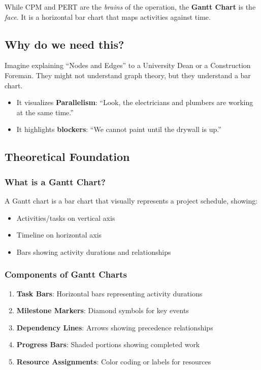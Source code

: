 \documentclass[
  letterpaper,
  DIV=11,
  numbers=noendperiod]{scrreprt}
\providecommand{\tightlist}{%
  \setlength{\itemsep}{0pt}\setlength{\parskip}{0pt}}
\begin{document}
While CPM and PERT are the \emph{brains} of the operation, the
\textbf{Gantt Chart} is the \emph{face}. It is a horizontal bar chart
that maps activities against time.

\subsection{Why do we need this?}\label{why-do-we-need-this}

Imagine explaining ``Nodes and Edges'' to a University Dean or a
Construction Foreman. They might not understand graph theory, but they
understand a bar chart.

\begin{itemize}
\tightlist
\item
  It visualizes \textbf{Parallelism}: ``Look, the electricians and
  plumbers are working at the same time.''
\item
  It highlights \textbf{blockers}: ``We cannot paint until the drywall
  is up.''
\end{itemize}

\subsection{Theoretical Foundation}\label{theoretical-foundation-6}

\subsubsection{What is a Gantt Chart?}\label{what-is-a-gantt-chart}

A Gantt chart is a bar chart that visually represents a project
schedule, showing:

\begin{itemize}
\tightlist
\item
  Activities/tasks on vertical axis
\item
  Timeline on horizontal axis
\item
  Bars showing activity durations and relationships
\end{itemize}

\subsubsection{Components of Gantt
Charts}\label{components-of-gantt-charts}

\begin{enumerate}
\def\labelenumi{\arabic{enumi}.}
\tightlist
\item
  \textbf{Task Bars}: Horizontal bars representing activity durations
\item
  \textbf{Milestone Markers}: Diamond symbols for key events
\item
  \textbf{Dependency Lines}: Arrows showing precedence relationships
\item
  \textbf{Progress Bars}: Shaded portions showing completed work
\item
  \textbf{Resource Assignments}: Color coding or labels for resources
\end{enumerate}
\end{document}
